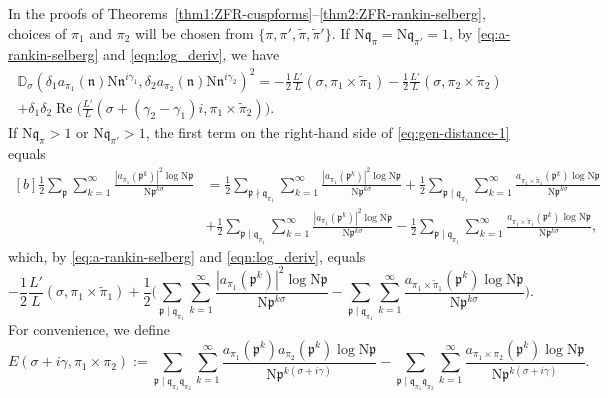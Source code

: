 \documentclass[12pt,reqno]{amsart}
\renewcommand{\tilde}{\widetilde}
\theoremstyle{remark}
\renewcommand{\tilde}{\widetilde}
\DeclareMathOperator{\Real}{Re}
\renewcommand{\tilde}{\widetilde}
\newcommand{\N}{\mathrm{N}}
\newcommand{\kp}{\mathfrak{p}}
\newcommand{\kq}{\mathfrak{q}}
\newcommand{\kn}{\mathfrak{n}}
\numberwithin{equation}{section}
\begin{document}
     In the proofs of Theorems~\ref{thm1:ZFR-cuspforms}--\ref{thm2:ZFR-rankin-selberg},  choices of $\pi_1$ and $\pi_2$  
    will be chosen from $\{\pi, \pi',\tilde{\pi},\tilde{\pi}'\}$. If $\N\kq_{\pi} = \N\kq_{\pi'} =1$,  by \eqref{eq:a-rankin-selberg} and \eqref{eqn:log_deriv}, we have 
    \begin{multline}
        \label{eq:gen-distance-2}
        \mathbb{D}_{\sigma}(\delta_1 a_{\pi_1}(\kn)\N\kn^{i\gamma_1},\delta_2 a_{\pi_2}(\kn)\N\kn^{i\gamma_2})^2 = -\frac{1}{2}\frac{L'}{L}(\sigma, \pi_1 \times \tilde{\pi}_1) -\frac{1}{2}\frac{L'}{L}(\sigma, \pi_2 \times \tilde{\pi}_2)\\
        +\delta_1\delta_2 \Real\Big(\frac{L'}{L}(\sigma+(\gamma_2-\gamma_1)i, \pi_1 \times \tilde{\pi}_2)\Big).
      \end{multline}
      If $\N\kq_{\pi}>1$ or $\N\kq_{\pi'} >1$, the first term on the right-hand side  of \eqref{eq:gen-distance-1} equals
	\begin{equation*}
		\begin{aligned}[b]
		   \frac{1}{2} \sum_{\kp} \sum_{k=1}^{\infty} \frac{|a_{\pi_1}(\kp^k)|^2\log \N\kp} {\N\kp^{k\sigma}} &= \frac{1}{2} \sum_{\kp  \nmid \kq_{\pi_1}} \sum_{k=1}^{\infty} \frac{|a_{\pi_1}(\kp^k)|^2\log \N\kp} {\N\kp^{k\sigma}} + 
			\frac{1}{2} \sum_{\kp  \mid \kq_{\pi_1}} \sum_{k=1}^{\infty} \frac{a_{\pi_1 \times \tilde{\pi}_1}(\kp^k)\log \N\kp} {\N\kp^{k\sigma}}\\
            &+ \frac{1}{2} \sum_{\kp  \mid \kq_{\pi_1}} \sum_{k=1}^{\infty} \frac{|a_{\pi_1}(\kp^k)|^2\log \N\kp} {\N\kp^{k\sigma}} 
			- \frac{1}{2} \sum_{\kp  \mid \kq_{\pi_1}} \sum_{k=1}^{\infty} \frac{a_{\pi_1 \times \tilde{\pi}_1}(\kp^k)\log \N\kp} {\N\kp^{k\sigma}},
		\end{aligned}
	\end{equation*}
    which, by \eqref{eq:a-rankin-selberg} and \eqref{eqn:log_deriv}, equals
    \begin{equation}
    \label{eq:gen-distance-term1-starter}
     -\frac{1}{2}\frac{L'}{L}(\sigma, \pi_1 \times \tilde{\pi}_1) +   
			\frac{1}{2} \Big(\sum_{\kp  \mid \kq_{\pi_1}} \sum_{k=1}^{\infty} \frac{|a_{\pi_1}(\kp^k)|^2\log \N\kp} {\N\kp^{k\sigma}} 
			- \sum_{\kp  \mid \kq_{\pi_1}} \sum_{k=1}^{\infty} \frac{a_{\pi_1 \times \tilde{\pi}_1}(\kp^k)\log \N\kp} {\N\kp^{k\sigma}}\Big).
    \end{equation}
	For convenience, we define 
	\begin{equation}\label{eq:def-E}
		E(\sigma+ i\gamma, \pi_1 \times \pi_2) :=  \sum_{\kp  \mid \kq_{\pi_1}\kq_{\pi_2}} \sum_{k=1}^{\infty} \frac{a_{\pi_1}(\kp^k)a_{\pi_2}(\kp^k)\log \N\kp}{\N\kp^{k(\sigma+i\gamma)}} 
		- \sum_{\kp  \mid \kq_{\pi_1}\kq_{\pi_2}} \sum_{k=1}^{\infty} \frac{a_{\pi_1 \times \pi_2}(\kp^k)\log \N\kp} {\N\kp^{k(\sigma+i\gamma)}}.
	\end{equation}
\end{document}
